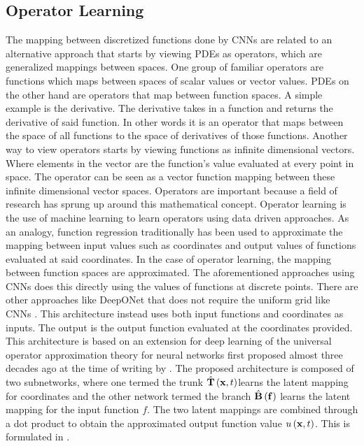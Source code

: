 \subsection*{Operator Learning}
The mapping between discretized functions done by CNNs are related to an alternative approach that starts by viewing PDEs as operators, which are generalized mappings between spaces. One group of familiar operators are functions which maps between spaces of scalar values or vector values. PDEs on the other hand are operators that map between function spaces. A simple example is the derivative. The derivative takes in a function and returns the derivative of said function. In other words it is an operator that maps between the space of all functions to the space of derivatives of those functions. Another way to view operators starts by viewing functions as infinite dimensional vectors. Where elements in the vector are the function's value evaluated at every point in space. The operator can be seen as a vector function mapping between these infinite dimensional vector spaces. Operators are important because a field of research has sprung up around this mathematical concept. Operator learning is the use of machine learning to learn operators using data driven approaches. As an analogy, function regression traditionally has been used to approximate the mapping between input values such as coordinates and output values of functions evaluated at said coordinates. In the case of operator learning, the mapping between function spaces are approximated. The aforementioned approaches using CNNs does this directly using the values of functions at discrete points. There are other approaches like DeepONet that does not require the uniform grid like CNNs \autocite{luLearningNonlinearOperators2021}. This architecture instead uses both input functions and coordinates as inputs. The output is the output function evaluated at the coordinates provided. This architecture is based on an extension for deep learning of the universal operator approximation theory for neural networks first proposed almost three decades ago at the time of writing by \textcite{chenUniversalApproximationNonlinear1995}. The proposed architecture is composed of two subnetworks, where one termed the trunk \(\hat{\vb{T}}\left(\vb{x},t\right)\)learns the latent mapping for coordinates and the other network termed the branch \(\hat{\vb{B}}\left(\vb{f}\right)\) learns the latent mapping for the input function \(f \). The two latent mappings are combined through a dot product to obtain the approximated output function value \(u \left( \vb{x}, t \right)\). This is formulated in .
